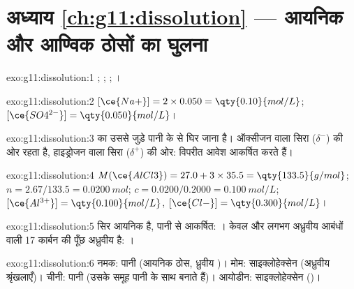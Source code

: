 \section*{अध्याय \ref{ch:g11:dissolution} --- आयनिक और आण्विक ठोसों का घुलना}

\begin{solution}{exo:g11:dissolution:1}
;
;
;
।
\end{solution}

\begin{solution}{exo:g11:dissolution:2}
$[\ce{Na+}] = 2 \times 0.050 = \qty{0.10}{mol/L}$;
$[\ce{SO4^{2-}}] = \qty{0.050}{mol/L}$।
\end{solution}

\begin{solution}{exo:g11:dissolution:3}
  का उससे जुड़े पानी के  से घिर जाना है।
ऑक्सीजन वाला सिरा ($\delta^-$)  की ओर रहता है, हाइड्रोजन वाला सिरा
($\delta^+$)  की ओर: विपरीत आवेश आकर्षित करते हैं।
\end{solution}

\begin{solution}{exo:g11:dissolution:4}
$M(\ce{AlCl3}) = 27.0 + 3 \times 35.5 = \qty{133.5}{g/mol}$;
$n = 2.67 / 133.5 = \qty{0.0200}{mol}$; $c = 0.0200 / 0.2000 =
\qty{0.100}{mol/L}$; $[\ce{Al^{3+}}] = \qty{0.100}{mol/L}$,
$[\ce{Cl-}] = \qty{0.300}{mol/L}$।
\end{solution}

\begin{solution}{exo:g11:dissolution:5}
सिर  आयनिक है, पानी से आकर्षित: । केवल  और लगभग
अध्रुवीय  आबंधों वाली 17 कार्बन  की पूँछ
अध्रुवीय है: ।
\end{solution}

\begin{solution}{exo:g11:dissolution:6}
नमक: पानी (आयनिक ठोस, ध्रुवीय )। मोम: साइक्लोहेक्सेन (अध्रुवीय
श्रृंखलाएँ)। चीनी: पानी (उसके  समूह पानी के साथ 
बनाते हैं)। आयोडीन: साइक्लोहेक्सेन ()।
\end{solution}

